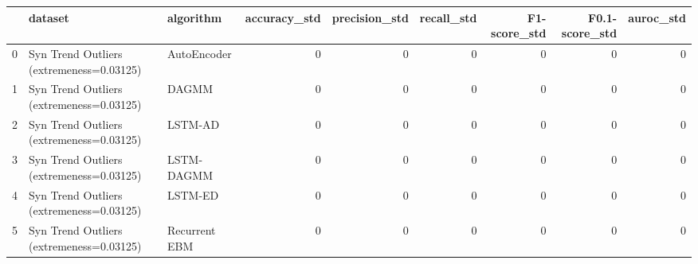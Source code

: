 \begin{tabular}{rllrrrrrr}
\hline
    & dataset                                  & algorithm     &   accuracy\_std &   precision\_std &   recall\_std &   F1-score\_std &   F0.1-score\_std &   auroc\_std \\
\hline
  0 & Syn Trend Outliers (extremeness=0.03125) & AutoEncoder   &              0 &               0 &            0 &              0 &                0 &           0 \\
  1 & Syn Trend Outliers (extremeness=0.03125) & DAGMM         &              0 &               0 &            0 &              0 &                0 &           0 \\
  2 & Syn Trend Outliers (extremeness=0.03125) & LSTM-AD       &              0 &               0 &            0 &              0 &                0 &           0 \\
  3 & Syn Trend Outliers (extremeness=0.03125) & LSTM-DAGMM    &              0 &               0 &            0 &              0 &                0 &           0 \\
  4 & Syn Trend Outliers (extremeness=0.03125) & LSTM-ED       &              0 &               0 &            0 &              0 &                0 &           0 \\
  5 & Syn Trend Outliers (extremeness=0.03125) & Recurrent EBM &              0 &               0 &            0 &              0 &                0 &           0 \\
\hline
\end{tabular}

